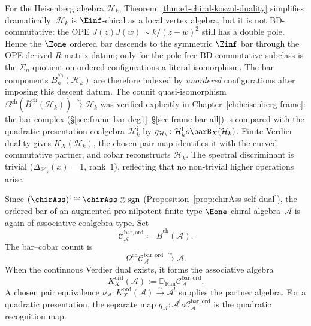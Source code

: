 \begin{example}\label{ex:heisenberg-e1-duality}
For the Heisenberg algebra $\mathcal{H}_k$,
Theorem~\ref{thm:e1-chiral-koszul-duality} simplifies dramatically:
$\mathcal{H}_k$ is $\Einf$-chiral as a local vertex algebra, but it is
not BD-commutative: the OPE $J(z)J(w) \sim k/(z-w)^2$ still has a
double pole. Hence the $\Eone$ ordered bar descends to the symmetric
$\Einf$ bar through the OPE-derived $R$-matrix datum; only for the
pole-free BD-commutative subclass is the $\Sigma_n$-quotient on ordered
configurations a literal isomorphism. The bar components
$\bar{B}_n^{\mathrm{ch}}(\mathcal{H}_k)$ are therefore indexed by
\emph{unordered} configurations after imposing this descent datum.
The counit quasi-isomorphism
$\Omega^{\mathrm{ch}}(\bar{B}^{\mathrm{ch}}(\mathcal{H}_k))
\xrightarrow{\sim} \mathcal{H}_k$
was verified explicitly in
Chapter~\ref{ch:heisenberg-frame}:
the bar complex
(\S\ref{sec:frame-bar-deg1}--\S\ref{sec:frame-bar-all})
is compared with the quadratic presentation coalgebra
$\mathcal H_k^{\mathrm i}$ by
$q_{\mathcal H_k}\colon\mathcal H_k^{\mathrm i}	o
\barB_X(\mathcal H_k)$.  Finite Verdier duality gives
$K_X(\mathcal H_k)$, the chosen pair map identifies it with the curved
commutative partner, and cobar reconstructs $\mathcal H_k$.
The spectral discriminant is trivial ($\Delta_{\mathcal{H}_k}(x)=1$,
rank~$1$), reflecting that no non-trivial higher operations arise.
\end{example}

\begin{corollary}
\label{cor:e1-self-duality}
Since
$(\chirAss)^! \cong \chirAss \otimes \operatorname{sgn}$
(Proposition~\ref{prop:chirAss-self-dual}), the ordered bar
of an augmented pro-nilpotent finite-type
$\Eone$\nobreakdash-chiral algebra~$\mathcal{A}$ is again of
associative coalgebra type.  Set
\[
\mathcal C_{\mathcal A}^{\mathrm{bar,ord}}
\coloneqq \bar{B}^{\mathrm{ch}}(\mathcal{A}).
\]
The bar--cobar counit is
\[
 \Omega^{\mathrm{ch}}
 \mathcal C_{\mathcal A}^{\mathrm{bar,ord}}
 \xrightarrow{\sim}\mathcal A.
\]
When the continuous Verdier dual exists, it forms the associative
algebra
\[
 K_X^{\mathrm{ord}}(\mathcal A)
 :=\mathbb D_{\operatorname{Ran}}
 \mathcal C_{\mathcal A}^{\mathrm{bar,ord}}.
\]
A chosen pair equivalence
$\nu_{\mathcal A}\colon K_X^{\mathrm{ord}}(\mathcal A)
\xrightarrow{\sim}\mathcal A^!$ supplies the partner algebra.
For a quadratic presentation, the separate map
$q_{\mathcal A}\colon\mathcal A^{\mathrm i}	o
\mathcal C_{\mathcal A}^{\mathrm{bar,ord}}$ is the quadratic
recognition map.
\end{corollary}

